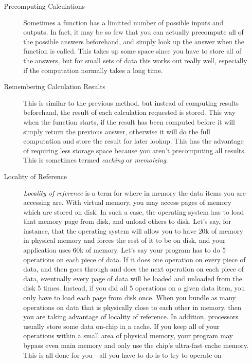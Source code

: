 \begin{description}
\item[Precomputing Calculations] Sometimes a function has a limitted number of possible inputs and outputs.  In
fact, it may be so few that you can actually precompute all of the possible
answers beforehand, and simply look up the answer when the function is called.
This takes up some space since you have to store all of the answers, but for
small sets of data this works out really well, especially if the computation
normally takes a long time.
\item[Remembering Calculation Results] This is similar to the previous method, but instead of computing results
beforehand, the result of each calculation requested is stored.  This way
when the function starts, if the result has been computed before it will
simply return the previous answer, otherwise it will do the full computation
and store the result for later lookup.  This has the advantage of requiring
less storage space because you aren't precomputing all results.  This
is sometimes termed \emph{caching} or \emph{memoizing}.
\item[Locality of Reference] \emph{Locality of reference} is a term for where in memory the 
data items you are accessing are.  With virtual memory, you may access pages
of memory which are stored on disk.  In such a case, the operating system has
to load that memory page from disk, and unload others to disk.  Let's say, 
for instance, that the operating system will allow you to have 20k of memory
in physical memory and forces the rest of it to be on disk, and your 
application uses 60k of memory.  Let's say your program has to do 5 operations 
on each piece of data.  If it does one operation on every piece of data, and 
then goes through and does the next operation on each piece of data, eventually
every page of data will be loaded and unloaded from the disk 5 times.  Instead,
if you did all 5 operations on a given data item, you only have to load each
page from disk once.  When you bundle as many operations on data that is
physically close to each other in memory, then you are taking advantage of 
locality of reference.  In addition, processors usually store some data on-chip
in a cache.  If you keep all of your operations within a small area of 
physical memory, your program may bypass even main memory and only use the chip's ultra-fast cache
memory.  This is all done for you - all you have to do is to try to operate on

\end{description}
